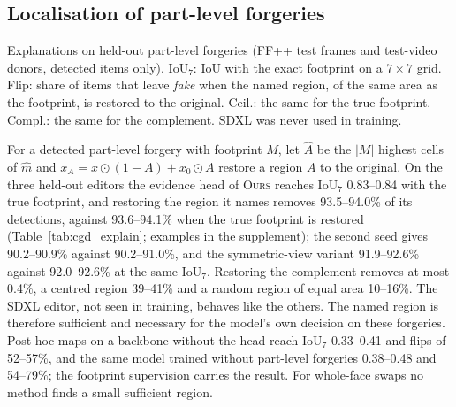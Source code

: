 \documentclass[conference]{IEEEtran}
\newcommand{\ours}{\textsc{Ours}}
\begin{document}
\subsection{Localisation of part-level forgeries}
\label{sec:cgd}
\begin{table}[t]
\centering
\caption{Explanations on held-out part-level forgeries (FF++ test frames and test-video donors, detected items only).
IoU$_7$: IoU with the exact footprint on a $7\times7$ grid. Flip: share of items that leave \emph{fake} when the named
region, of the same area as the footprint, is restored to the original. Ceil.: the same for the true footprint. Compl.:
the same for the complement. SDXL was never used in training.}
\label{tab:cgd_explain}
\footnotesize
\begin{adjustbox}{max width=\textwidth}\end{adjustbox}
\end{table}
For a detected part-level forgery with footprint $M$, let $\hat A$ be the $|M|$ highest cells of $\hat m$ and
$x_A=x\odot(1-A)+x_0\odot A$ restore a region $A$ to the original. On the three held-out editors the evidence head of
\ours{} reaches IoU$_7$ 0.83--0.84 with the true footprint, and restoring the region it names removes 93.5--94.0\% of
its detections, against 93.6--94.1\% when the true footprint is restored (Table~\ref{tab:cgd_explain}; examples in the supplement); the second seed gives 90.2--90.9\% against 90.2--91.0\%, and the
symmetric-view variant 91.9--92.6\% against 92.0--92.6\% at the same IoU$_7$. Restoring the complement removes at most
0.4\%, a centred region 39--41\% and a random region of equal area 10--16\%. The SDXL editor, not seen in training,
behaves like the others. The named region is therefore sufficient and necessary for the model's own decision on these
forgeries. Post-hoc maps on a backbone without the head reach IoU$_7$ 0.33--0.41 and flips of 52--57\%, and the same
model trained without part-level forgeries 0.38--0.48 and 54--79\%; the footprint supervision carries the result. For
whole-face swaps no method finds a small sufficient region.

\end{document}
